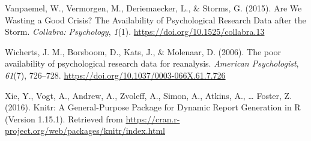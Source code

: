 \documentclass[
  american,
  ,doc,floatsintext]{apa6}
\begin{document}
\leavevmode\hypertarget{ref-vanpaemel_are_2015}{}%
Vanpaemel, W., Vermorgen, M., Deriemaecker, L., \& Storms, G. (2015). Are We Wasting a Good Crisis? The Availability of Psychological Research Data after the Storm. \emph{Collabra: Psychology}, \emph{1}(1). \url{https://doi.org/10.1525/collabra.13}

\leavevmode\hypertarget{ref-wicherts_poor_2006}{}%
Wicherts, J. M., Borsboom, D., Kats, J., \& Molenaar, D. (2006). The poor availability of psychological research data for reanalysis. \emph{American Psychologist}, \emph{61}(7), 726--728. \url{https://doi.org/10.1037/0003-066X.61.7.726}

\leavevmode\hypertarget{ref-xie_knitr:_2016}{}%
Xie, Y., Vogt, A., Andrew, A., Zvoleff, A., Simon, A., Atkins, A., \ldots{} Foster, Z. (2016). Knitr: A General-Purpose Package for Dynamic Report Generation in R (Version 1.15.1). Retrieved from \url{https://cran.r-project.org/web/packages/knitr/index.html}
\end{document}
